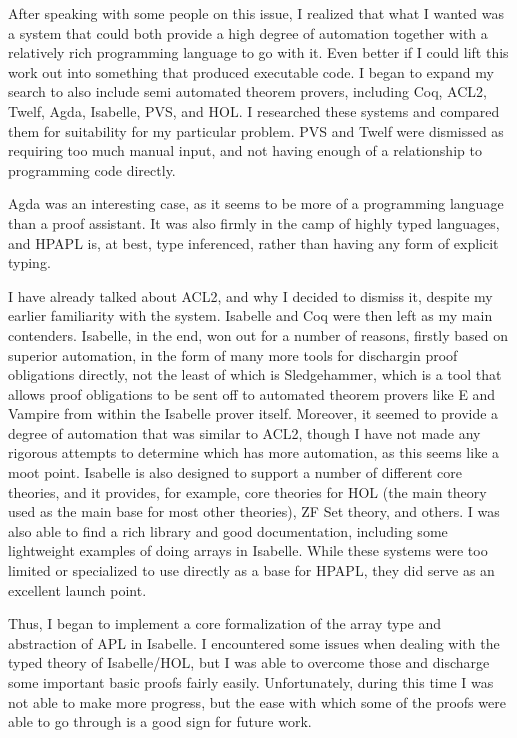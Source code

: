 After speaking with some people on this issue, I realized that what I 
wanted was a system that could both provide a high degree of automation 
together with a relatively rich programming language to go with it. Even 
better if I could lift this work out into something that produced 
executable code. I began to expand my search to also include semi automated 
theorem provers, including Coq, ACL2, Twelf, Agda, Isabelle, PVS, and 
HOL. I researched these systems and compared them for suitability for my 
particular problem. PVS and Twelf were dismissed as requiring too much 
manual input, and not having enough of a relationship to programming 
code directly. 

Agda was an interesting case, as it seems to be more of a programming 
language than a proof assistant. It was also firmly in the camp of highly 
typed languages, and HPAPL is, at best, type inferenced, rather than 
having any form of explicit typing.

I have already talked about ACL2, and why I decided to dismiss it, 
despite my earlier familiarity with the system. Isabelle and Coq were 
then left as my main contenders. Isabelle, in the end, won out for a 
number of reasons, firstly based on superior automation, in the form of 
many more tools for dischargin proof obligations directly, not the least
of which is Sledgehammer, which is a tool that allows proof obligations 
to be sent off to automated theorem provers like E and Vampire from within 
the Isabelle prover itself. Moreover, it seemed to provide a degree of 
automation that was similar to ACL2, though I have not made any rigorous 
attempts to determine which has more automation, as this seems like a moot 
point. Isabelle is also designed to support a number of different core 
theories, and it provides, for example, core theories for HOL (the main 
theory used as the main base for most other theories), ZF Set theory, 
and others. I was also able to find a rich library and good documentation, 
including some lightweight examples of doing arrays in Isabelle. While 
these systems were too limited or specialized to use directly as a base 
for HPAPL, they did serve as an excellent launch point. 

Thus, I began to implement a core formalization of the array type and 
abstraction of APL in Isabelle. I encountered some issues when dealing 
with the typed theory of Isabelle/HOL, but I was able to overcome those 
and discharge some important basic proofs fairly easily. Unfortunately, 
during this time I was not able to make more progress, but the ease with 
which some of the proofs were able to go through is a good sign for 
future work.

